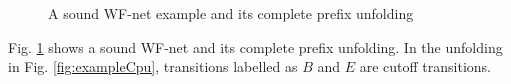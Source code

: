\documentclass{llncs}
\begin{document}
\begin{figure}[!htb]
\centering
{}
\caption{A sound WF-net example and its complete prefix unfolding}
\label{fig:examplePetriAndCpu}
\end{figure}

\begin{example}\label{ex:petriAndCpu}
Fig. \ref{fig:examplePetriAndCpu} shows a sound WF-net and its complete prefix unfolding. In the unfolding in Fig. \ref{fig:exampleCpu}, transitions labelled as $B$ and $E$ are cutoff transitions.
\end{example}
\end{document}
